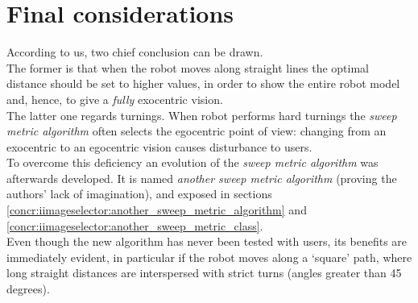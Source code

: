 \section{Final considerations}
\label{performance_evaluation:finalconsiderations}

According to us, two chief conclusion can be drawn.
\\
The former is that when the robot moves along straight lines
the optimal distance should be set to higher values, in order
to show the entire robot model and, hence, to give a \textit{fully}
exocentric vision.
\\
The latter one regards turnings. When robot performs hard turnings
the \textit{sweep metric algorithm} often selects the egocentric
point of view: changing from an exocentric to an egocentric vision
causes disturbance to users.
\\
To overcome this deficiency an evolution of the \textit{sweep metric
algorithm} was afterwards developed. It is named \textit{another sweep
metric algorithm} (proving the authors' lack of imagination), and
exposed in sections 
\ref{concr:iimageselector:another_sweep_metric_algorithm} and
\ref{concr:iimageselector:another_sweep_metric_class}.
\\
Even though the new algorithm has never been tested with users, its
benefits are immediately evident, in particular if the robot moves
along a `square' path, where long straight distances are interspersed
with strict turns (angles greater than 45 degrees).
